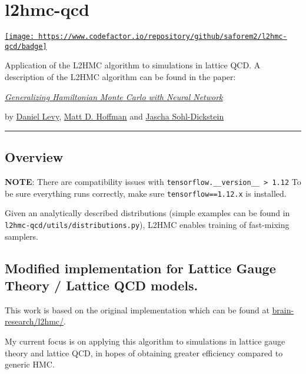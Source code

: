 \hypertarget{l2hmc-qcd}{%
\section{l2hmc-qcd}\label{l2hmc-qcd}}

\href{https://www.codefactor.io/repository/github/saforem2/l2hmc-qcd}{\texttt{[image: https://www.codefactor.io/repository/github/saforem2/l2hmc-qcd/badge]}}

Application of the L2HMC algorithm to simulations in lattice QCD. A
description of the L2HMC algorithm can be found in the paper:

\href{https://arxiv.org/abs/1711.09268}{\emph{Generalizing Hamiltonian
Monte Carlo with Neural Network}}

by \href{http://ai.stanford.edu/~danilevy}{Daniel Levy},
\href{http://matthewdhoffman.com/}{Matt D. Hoffman} and
\href{sohldickstein.com}{Jascha Sohl-Dickstein}

\begin{center}\rule{0.5\linewidth}{\linethickness}\end{center}

\hypertarget{overview}{%
\subsection{Overview}\label{overview}}

\textbf{NOTE}: There are compatibility issues with
\texttt{tensorflow.\_\_version\_\_\ \textgreater{}\ 1.12} To be sure
everything runs correctly, make sure \texttt{tensorflow==1.12.x} is
installed.

Given an analytically described distributions (simple examples can be
found in \texttt{l2hmc-qcd/utils/distributions.py}), L2HMC enables
training of fast-mixing samplers.

\hypertarget{modified-implementation-for-lattice-gauge-theory-lattice-qcd-models.}{%
\subsection{Modified implementation for Lattice Gauge Theory / Lattice
QCD
models.}\label{modified-implementation-for-lattice-gauge-theory-lattice-qcd-models.}}

This work is based on the original implementation which can be found at
\href{https://github.com/brain-research/l2hmc}{brain-research/l2hmc/}.

My current focus is on applying this algorithm to simulations in lattice
gauge theory and lattice QCD, in hopes of obtaining greater efficiency
compared to generic HMC.

